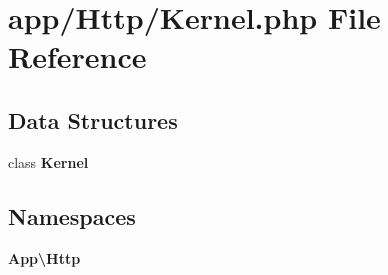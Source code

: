 \section{app/\+Http/\+Kernel.php File Reference}
\label{app_2_http_2_kernel_8php}
\subsection*{Data Structures}
\begin{DoxyCompactItemize}
\item 
class {\bf Kernel}
\end{DoxyCompactItemize}
\subsection*{Namespaces}
\begin{DoxyCompactItemize}
\item 
 {\bf App\textbackslash{}\+Http}
\end{DoxyCompactItemize}
